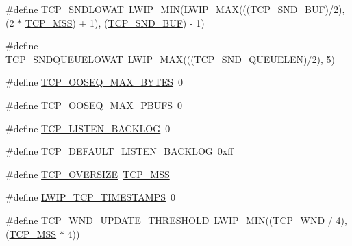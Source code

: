 \begin{DoxyCompactItemize}
\item 
\#define \hyperlink{group__lwip__opts__tcp_gae5c9866d7cd463ac7b36792182145aec}{T\+C\+P\+\_\+\+S\+N\+D\+L\+O\+W\+AT}~\hyperlink{openmote-cc2538_2lwip_2src_2include_2lwip_2def_8h_a748f5df614a3fc989e8900fd229d6e4e}{L\+W\+I\+P\+\_\+\+M\+IN}(\hyperlink{openmote-cc2538_2lwip_2src_2include_2lwip_2def_8h_a21ea174d374106caeafb4aa3a24fbd2b}{L\+W\+I\+P\+\_\+\+M\+AX}(((\hyperlink{openmote-cc2538_2lwip_2test_2unit_2lwipopts_8h_a871d111968d8c6c7880ff36b93c5c4dd}{T\+C\+P\+\_\+\+S\+N\+D\+\_\+\+B\+UF})/2), (2 $\ast$ \hyperlink{group__lwip__opts__tcp_gaf1ab7bb27860aa3677c387a2f3ba317b}{T\+C\+P\+\_\+\+M\+SS}) + 1), (\hyperlink{openmote-cc2538_2lwip_2test_2unit_2lwipopts_8h_a871d111968d8c6c7880ff36b93c5c4dd}{T\+C\+P\+\_\+\+S\+N\+D\+\_\+\+B\+UF}) -\/ 1)
\item 
\#define \hyperlink{group__lwip__opts__tcp_ga75659867592a6b01c198532ed1b65698}{T\+C\+P\+\_\+\+S\+N\+D\+Q\+U\+E\+U\+E\+L\+O\+W\+AT}~\hyperlink{openmote-cc2538_2lwip_2src_2include_2lwip_2def_8h_a21ea174d374106caeafb4aa3a24fbd2b}{L\+W\+I\+P\+\_\+\+M\+AX}(((\hyperlink{openmote-cc2538_2lwip_2test_2unit_2lwipopts_8h_a9beaa47832ead4180981bfbf71074904}{T\+C\+P\+\_\+\+S\+N\+D\+\_\+\+Q\+U\+E\+U\+E\+L\+EN})/2), 5)
\item 
\#define \hyperlink{group__lwip__opts__tcp_ga9d6d3219bb5fc0bc760a64114de13c25}{T\+C\+P\+\_\+\+O\+O\+S\+E\+Q\+\_\+\+M\+A\+X\+\_\+\+B\+Y\+T\+ES}~0
\item 
\#define \hyperlink{group__lwip__opts__tcp_ga1f57d3859c4556f785708e5dc440617e}{T\+C\+P\+\_\+\+O\+O\+S\+E\+Q\+\_\+\+M\+A\+X\+\_\+\+P\+B\+U\+FS}~0
\item 
\#define \hyperlink{group__lwip__opts__tcp_ga98b23e7cbd3281915c50a485cb61899d}{T\+C\+P\+\_\+\+L\+I\+S\+T\+E\+N\+\_\+\+B\+A\+C\+K\+L\+OG}~0
\item 
\#define \hyperlink{group__lwip__opts__tcp_ga93cce3f47e33df11248c908d1775bacf}{T\+C\+P\+\_\+\+D\+E\+F\+A\+U\+L\+T\+\_\+\+L\+I\+S\+T\+E\+N\+\_\+\+B\+A\+C\+K\+L\+OG}~0xff
\item 
\#define \hyperlink{group__lwip__opts__tcp_ga5648e2580bb55c0efdfbebcf3bad1eef}{T\+C\+P\+\_\+\+O\+V\+E\+R\+S\+I\+ZE}~\hyperlink{group__lwip__opts__tcp_gaf1ab7bb27860aa3677c387a2f3ba317b}{T\+C\+P\+\_\+\+M\+SS}
\item 
\#define \hyperlink{group__lwip__opts__tcp_ga249bc450bb818cf2ef3cf1472ff354fd}{L\+W\+I\+P\+\_\+\+T\+C\+P\+\_\+\+T\+I\+M\+E\+S\+T\+A\+M\+PS}~0
\item 
\#define \hyperlink{group__lwip__opts__tcp_ga5d45732ba3a8438b141096d86e07ef8d}{T\+C\+P\+\_\+\+W\+N\+D\+\_\+\+U\+P\+D\+A\+T\+E\+\_\+\+T\+H\+R\+E\+S\+H\+O\+LD}~\hyperlink{openmote-cc2538_2lwip_2src_2include_2lwip_2def_8h_a748f5df614a3fc989e8900fd229d6e4e}{L\+W\+I\+P\+\_\+\+M\+IN}((\hyperlink{openmote-cc2538_2lwip_2test_2unit_2lwipopts_8h_a7f535a6efb5cdf86c3210e35ece1d6a7}{T\+C\+P\+\_\+\+W\+ND} / 4), (\hyperlink{group__lwip__opts__tcp_gaf1ab7bb27860aa3677c387a2f3ba317b}{T\+C\+P\+\_\+\+M\+SS} $\ast$ 4))

\end{DoxyCompactItemize}
